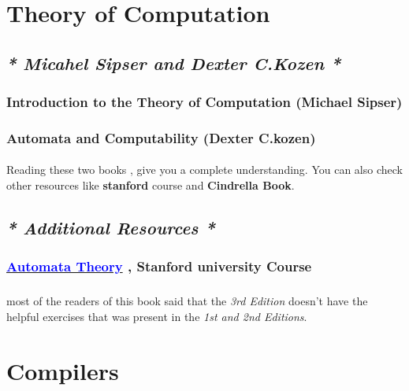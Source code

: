 \documentclass[12pt, a4paper]{article}
\begin{document}
\section{Theory of Computation}

\subsection*{\emph{* Micahel Sipser and Dexter C.Kozen *}}
\subsubsection*{Introduction to the Theory of Computation (Michael Sipser)}
\subsubsection*{Automata and Computability (Dexter C.kozen)}
\paragraph{}
Reading these two books , give you a complete understanding. You can also check other resources like \textbf{stanford} course and \textbf{Cindrella Book}.

\subsection*{\emph{* Additional Resources *}}
\subsubsection*{\href{https://www.edx.org/course/automata-theory}{\textcolor{blue}{Automata Theory}} , Stanford university Course}
\subsubsection*{}
\paragraph{}
most of the readers of this book said that the \emph{3rd Edition} doesn't have the helpful exercises that was present in the \emph{1st and 2nd Editions}.

\section{Compilers}
\end{document}
